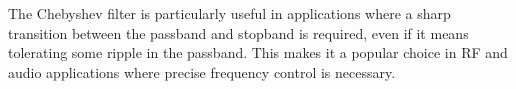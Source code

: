 The Chebyshev filter is particularly useful in applications where a sharp transition between the passband and stopband is required, even if it means tolerating some ripple in the passband. This makes it a popular choice in RF and audio applications where precise frequency control is necessary.

